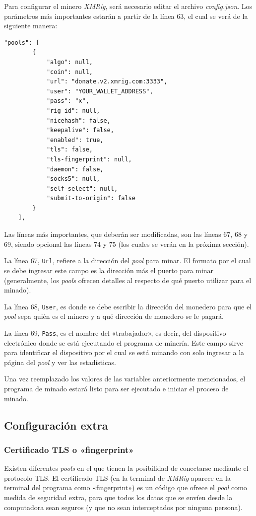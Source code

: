 \documentclass[12pt,a4paper,twoside]{book}
\begin{document}
Para configurar el minero \textit{XMRig}, será necesario editar el archivo \textit{config.json}. Los parámetros más importantes estarán a partir de la línea 63, el cual se verá de la siguiente manera:

\lstset{language=java, firstnumber=63, showstringspaces=false, numbers=left}
\begin{lstlisting}
"pools": [
        {
            "algo": null,
            "coin": null,
            "url": "donate.v2.xmrig.com:3333",
            "user": "YOUR_WALLET_ADDRESS",
            "pass": "x",
            "rig-id": null,
            "nicehash": false,
            "keepalive": false,
            "enabled": true,
            "tls": false,
            "tls-fingerprint": null,
            "daemon": false,
            "socks5": null,
            "self-select": null,
            "submit-to-origin": false
        }
    ],
\end{lstlisting}

Las líneas más importantes, que deberán ser modificadas, son las líneas 67, 68 y 69, siendo opcional las líneas 74 y 75 (los cuales se verán en la próxima sección).

La línea 67, \texttt{Url}, refiere a la dirección del \textit{pool} para minar. El formato por el cual se debe ingresar este campo es la dirección más el puerto para minar (generalmente, los \textit{pools} ofrecen detalles al respecto de qué puerto utilizar para el minado).

La línea 68, \texttt{User}, es donde se debe escribir la dirección del monedero para que el \textit{pool} sepa quién es el minero y a qué dirección de monedero se le pagará.

La línea 69, \texttt{Pass}, es el nombre del «trabajador», es decir, del dispositivo electrónico donde se está ejecutando el programa de minería. Este campo sirve para identificar el dispositivo por el cual se está minando con solo ingresar a la página del \textit{pool} y ver las estadísticas.

Una vez reemplazado los valores de las variables anteriormente mencionados, el programa de minado estará listo para ser ejecutado e iniciar el proceso de minado.

\subsection{Configuración extra}
\subsubsection{Certificado TLS o «fingerprint»}
Existen diferentes \textit{pools} en el que tienen la posibilidad de conectarse mediante el protocolo TLS. El certificado TLS (en la terminal de \textit{XMRig} aparece en la terminal del programa como «fingerprint») es un código que ofrece el \textit{pool} como medida de seguridad extra, para que todos los datos que se envíen desde la computadora sean seguros (y que no sean interceptados por ninguna persona).	
\end{document}
